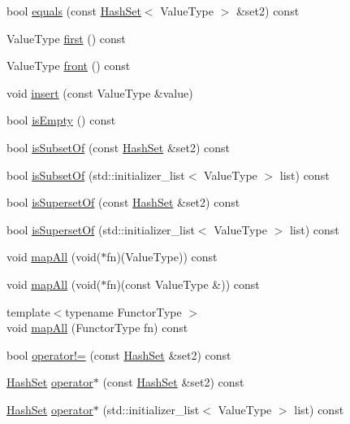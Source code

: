 \begin{DoxyCompactItemize}
bool \mbox{\hyperlink{classHashSet_a16727fc4448f50657a8f1061de18961b}{equals}} (const \mbox{\hyperlink{classHashSet}{Hash\+Set}}$<$ Value\+Type $>$ \&set2) const
\item 
Value\+Type \mbox{\hyperlink{classHashSet_aaeecd3ae022dd6b19df936718f4ab831}{first}} () const
\item 
Value\+Type \mbox{\hyperlink{classHashSet_abaa174a9d74f7e7e38d4944fa43b5a33}{front}} () const
\item 
void \mbox{\hyperlink{classHashSet_ad2b89af3c836e14eecca0f9a4b4d6721}{insert}} (const Value\+Type \&value)
\item 
bool \mbox{\hyperlink{classHashSet_acf82f9b2937375c7b1cf3dccb3df3312}{is\+Empty}} () const
\item 
bool \mbox{\hyperlink{classHashSet_ab7ef7e75d2eb0ad6270091df7d74dc0c}{is\+Subset\+Of}} (const \mbox{\hyperlink{classHashSet}{Hash\+Set}} \&set2) const
\item 
bool \mbox{\hyperlink{classHashSet_a4d0c68e90ea31896c3c74b8d8a066db2}{is\+Subset\+Of}} (std\+::initializer\+\_\+list$<$ Value\+Type $>$ list) const
\item 
bool \mbox{\hyperlink{classHashSet_abd1ad97944f01a8e5c462f5f356e6237}{is\+Superset\+Of}} (const \mbox{\hyperlink{classHashSet}{Hash\+Set}} \&set2) const
\item 
bool \mbox{\hyperlink{classHashSet_ad715481e7f266fb44aa3fa9f447cd4fe}{is\+Superset\+Of}} (std\+::initializer\+\_\+list$<$ Value\+Type $>$ list) const
\item 
void \mbox{\hyperlink{classHashSet_a2931bda025b4800f128f37790d21f49f}{map\+All}} (void($\ast$fn)(Value\+Type)) const
\item 
void \mbox{\hyperlink{classHashSet_a395b81e6a77aa9702362198771785dfd}{map\+All}} (void($\ast$fn)(const Value\+Type \&)) const
\item 
{\footnotesize template$<$typename Functor\+Type $>$ }\\void \mbox{\hyperlink{classHashSet_a8dc32c1e45704cfae41daf8adb4e66dc}{map\+All}} (Functor\+Type fn) const
\item 
bool \mbox{\hyperlink{classHashSet_a90987c08d76b230d602596449d96d14b}{operator!=}} (const \mbox{\hyperlink{classHashSet}{Hash\+Set}} \&set2) const
\item 
\mbox{\hyperlink{classHashSet}{Hash\+Set}} \mbox{\hyperlink{classHashSet_a0baed135da0add94fe4872ad8e7156ad}{operator$\ast$}} (const \mbox{\hyperlink{classHashSet}{Hash\+Set}} \&set2) const
\item 
\mbox{\hyperlink{classHashSet}{Hash\+Set}} \mbox{\hyperlink{classHashSet_ac58647555d640e08d77b282487762f3c}{operator$\ast$}} (std\+::initializer\+\_\+list$<$ Value\+Type $>$ list) const

\end{DoxyCompactItemize}
